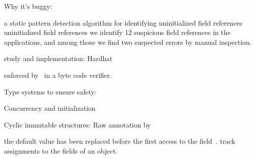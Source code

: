 Why it's buggy:

\cite{Seo:2007:SBD:1522565.1522587}
a static pattern detection algorithm for identifying uninitialized field references
uninitialized field references
we identify 12 suspicious field references in the applications, and among those we find two suspected errors by manual inspection.



study and implementation:
Hardhat~\cite{Gil:2009:WRS:1615184.1615216}

enforced by~\cite{Hubert:2010:ESO:1888881.1888890} in a byte code verifier.





Type systems to ensure safety:

Concurrency and initialization~\cite{Matsakis:2010:TTS:1869459.1869511}



Cyclic immutable structures:
Raw annotation by~\cite{Zibin:2010:OIG:1869459.1869509}


the default value has been replaced before
the first access to the field~\cite{Fahndrich:2007:EOI:1297027.1297052,XinQi:2009}.
track assignments to the fields of an object.
